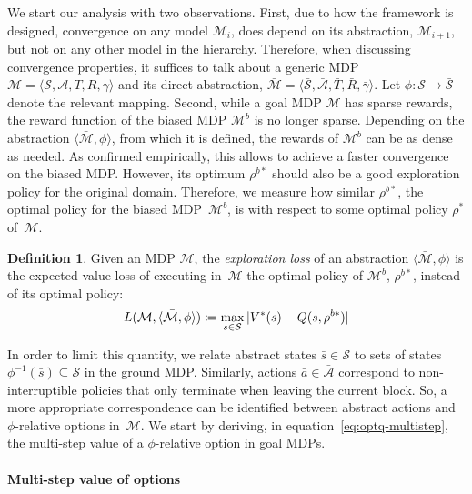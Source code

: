 \documentclass[letterpaper]{article} %
\theoremstyle{plain}
\theoremstyle{definition}
\newtheorem{definition}{Definition}
\theoremstyle{remark}
\DeclarePairedDelimiter{\abs}{\lvert}{\rvert}
\newcommand{\SetSym}[1]{\mathcal{#1}}
\newcommand{\Policy}{\rho}
\newcommand{\States}{\SetSym{S}}
\newcommand{\Actions}{\SetSym{A}}
\newcommand{\Model}{\SetSym{M}}
\newcommand{\Mapping}{\phi}
\newcommand{\Biased}[1]{#1^{b}}
\newcommand{\BiasedStar}[1]{#1^{b*}}
\newcommand{\Abst}[1]{\bar{#1}}
\begin{document}
We start our analysis with two observations.
First, due to how the framework is designed, convergence on any model $\Model_i$, does depend on its abstraction, $\Model_{i+1}$, but not on any other model in the hierarchy.
Therefore, when discussing convergence properties, it suffices to talk about a generic MDP $\Model = \langle \States, \Actions, T, R, \gamma \rangle$ and its direct abstraction, $\Abst{\Model} = \langle \Abst{\States}, \Abst{\Actions}, \Abst{T}, \Abst{R}, \Abst{\gamma} \rangle$.
Let $\Mapping: \States \to \Abst{\States}$ denote the relevant mapping.
%
Second, while a goal MDP $\Model$ has sparse rewards, the reward function of the biased MDP $\Biased\Model$ is no longer sparse.
Depending on the abstraction $\langle \Abst\Model, \Mapping \rangle$, from which it is defined, the rewards of $\Biased\Model$ can be as dense as needed.
As confirmed empirically, this allows to achieve a faster convergence on the biased MDP.
However, its optimum $\BiasedStar\Policy$ should also be a good exploration policy for the original domain.
Therefore, we measure how similar $\BiasedStar{\Policy}$, the optimal policy for the biased MDP~$\Biased\Model$, is with respect to some optimal policy $\Policy^*$ of~$\Model$.

\begin{definition}
	Given an MDP $\Model$, the \emph{exploration loss} of an abstraction $\langle \Abst\Model, \Mapping \rangle$ is the expected value loss of executing in~$\Model$ the optimal policy of $\Biased\Model$, $\BiasedStar\Policy$, instead of its optimal policy:
	\begin{equation}
		L(\Model, \langle \Abst\Model, \Mapping \rangle) \coloneqq \max_{s \in \States}\,
		\abs{V^*(s) - Q(s, \BiasedStar\Policy)}
	\end{equation}
	\label{def:exploration-loss}
\end{definition}

In order to limit this quantity, we relate abstract states $\Abst{s} \in \Abst{\States}$ to sets of states $\Mapping^{-1}(\Abst{s}) \subseteq \States$ in the ground MDP.
Similarly, actions $\Abst{a} \in \Abst\Actions$ correspond to non-interruptible policies that only terminate when leaving the current block.
So, a more appropriate correspondence can be identified between abstract actions and $\Mapping$-relative {options} in~$\Model$.
We start by deriving, in equation~\eqref{eq:optq-multistep}, the multi-step value of a $\Mapping$-relative option in goal MDPs.


\paragraph{Multi-step value of options}
\end{document}
